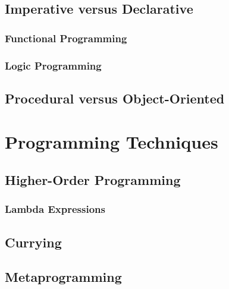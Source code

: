 
\subsection{Imperative versus Declarative}

\subsubsection{Functional Programming}

\subsubsection{Logic Programming}


\subsection{Procedural versus Object-Oriented}


\toclineskip
\section{Programming Techniques}

\subsection{Higher-Order Programming}

\subsubsection{Lambda Expressions}

\subsection{Currying}

\subsection{Metaprogramming}

\newpage


